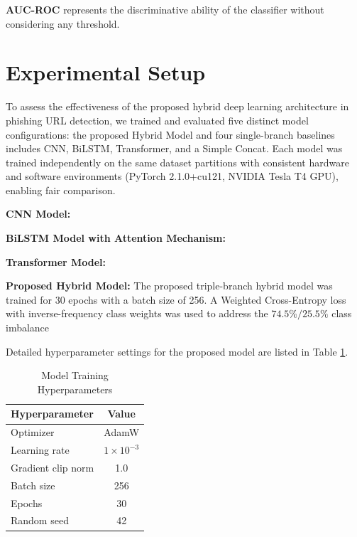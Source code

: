 \documentclass[conference]{IEEEtran}
\begin{document}
\textbf{AUC-ROC} represents the discriminative ability of the classifier without considering any threshold.



\section{Experimental Setup}
To assess the effectiveness of the proposed hybrid deep learning architecture in phishing URL detection, we trained and evaluated five distinct model configurations: the proposed Hybrid Model and four single-branch baselines includes CNN, BiLSTM, Transformer, and a Simple Concat. Each model was trained independently on the same dataset partitions with consistent hardware and software environments (PyTorch 2.1.0+cu121, NVIDIA Tesla T4 GPU), enabling fair comparison.


\textbf{CNN Model:} 

\textbf{BiLSTM Model with Attention Mechanism:} 

\textbf{Transformer Model:} 

\textbf{Proposed Hybrid Model:} The proposed triple-branch hybrid model was trained for 30 epochs with a batch size of 256. A Weighted Cross-Entropy loss with inverse-frequency class weights was used to address the $74.5\% / 25.5\%$ class imbalance


Detailed hyperparameter settings for the proposed model are listed in Table \ref{tab:hyperparameters}.

\begin{table}[htbp]
\caption{Model Training Hyperparameters}
\label{tab:hyperparameters}
\centering
\begin{tabular}{lc}
\hline
\textbf{Hyperparameter} & \textbf{Value} \\ \hline
Optimizer & AdamW \\
Learning rate & $1 \times 10^{-3}$ \\
Gradient clip norm & 1.0 \\
Batch size & 256 \\
Epochs & 30 \\
Random seed & 42 \\ \hline
\end{tabular}
\end{table}
\end{document}
